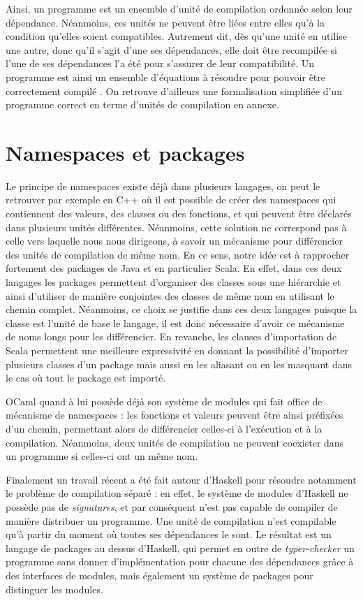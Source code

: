 \documentclass[11pt,a4paper]{report}
\begin{document}
Ainsi, un programme est un ensemble d'unité de compilation ordonnée selon leur
dépendance. Néanmoins, ces unités ne peuvent être liées entre elles qu'à la
condition qu'elles soient compatibles. Autrement dit, dès qu'une unité en
utilise une autre, donc qu'il s'agit d'une ses dépendances, elle doit être
recompilée si l'une de ses dépendances l'a été pour s'assurer de leur
compatibilité. Un programme est ainsi un ensemble d'équations à résoudre
pour pouvoir être correctement compilé \cite{Drossopoulou99afragment}. On
retrouve d'ailleurs une formalisation simplifiée d'un programme correct en terme
d'unités de compilation en annexe.

\section{Namespaces et packages}

Le principe de namespaces existe déjà dans plusieurs langages, on peut le
retrouver par exemple en C++\cite{cppspec} où il est possible de créer des
namespaces qui contiennent des valeurs, des classes ou des fonctions, et qui
peuvent être déclarés dans plusieurs unités différentes. Néanmoins, cette
solution ne correspond pas à celle vers laquelle nous nous dirigeons, à savoir
un mécanisme pour différencier des unités de compilation de même nom. En ce
sens, notre idée est à rapprocher fortement des packages de Java\cite{java-spec}
et en particulier Scala\cite{scalaspec}. En effet, dans ces deux langages les
packages permettent d'organiser des classes sous une hiérarchie et ainsi
d'utiliser de manière conjointes des classes de même nom en utilisant le chemin
complet. Néanmoins, ce choix se justifie dans ces deux langages puisque la
classe est l'unité de base le langage, il est donc nécessaire d'avoir ce
mécanisme de noms longs pour les différencier. En revanche, les clauses
d'importation de Scala permettent une meilleure expressivité en donnant la
possibilité d'importer plusieurs classes d'un package mais aussi en les aliasant
ou en les masquant dans le cas où tout le package est importé.

OCaml quand à lui possède déjà son système de modules\cite{Leroy00} qui fait
office de mécanisme de namespaces : les fonctions et valeurs peuvent être ainsi
préfixées d'un chemin, permettant alors de différencier celles-ci à l'exécution
et à la compilation. Néanmoins, deux unités de compilation ne peuvent coexister
dans un programme si celles-ci ont un même nom.

Finalement un travail récent a été fait autour d'Haskell pour résoudre notamment
le problème de compilation séparé\cite{KilpatrickDJM14} : en effet, le système
de modules d'Haskell ne possède pas de \emph{signatures}, et par conséquent
n'est pas capable de compiler de manière distribuer un programme. Une unité de
compilation n'est compilable qu'à partir du moment où toutes ses dépendances le
sont. Le résultat est un langage de packages au dessus d'Haskell, qui permet en
outre de \emph{typer-checker} un programme sans donner d'implémentation pour
chacune des dépendances grâce à des interfaces de modules, mais également un
système de packages pour distinguer les modules.
\end{document}
